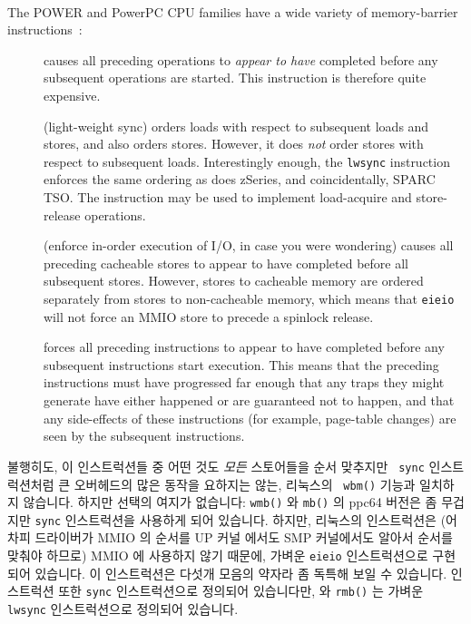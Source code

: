 The POWER and PowerPC\textsuperscript{\textregistered}
CPU families have a wide variety of memory-barrier
instructions~\cite{PowerPC94,MichaelLyons05a}:
\begin{description}
\item	[] causes all preceding operations to {\em appear to have}
	completed before any subsequent operations are started.
	This instruction is therefore quite expensive.
\item	[] (light-weight sync) orders loads with respect to
	subsequent loads and stores, and also orders stores.
	However, it does {\em not} order stores with respect to subsequent
	loads.
	Interestingly enough, the {\tt lwsync} instruction enforces
	the same ordering as does zSeries, and coincidentally,
	SPARC TSO.
	The  instruction may be used to implement
	load-acquire and store-release operations.
\item	[] (enforce in-order execution of I/O, in case you
	were wondering) causes all preceding cacheable stores to appear
	to have completed before all subsequent stores.
	However, stores to cacheable memory are ordered separately from
	stores to non-cacheable memory, which means that {\tt eieio}
	will not force an MMIO store to precede a spinlock release.
\item	[] forces all preceding instructions to appear to have
	completed before any subsequent instructions start execution.
	This means that the preceding instructions must have progressed
	far enough that any traps they might generate have either happened
	or are guaranteed not to happen, and that any side-effects of
	these instructions (for example, page-table changes) are seen by the
	subsequent instructions.
\end{description}
\fi

불행히도, 이 인스트럭션들 중 어떤 것도 {\em 모든} 스토어들을 순서 맞추지만 {\tt
sync} 인스트럭션처럼 큰 오버헤드의 많은 동작을 요하지는 않는, 리눅스의 {\tt
wbm()} 기능과 일치하지 않습니다.
하지만 선택의 여지가 없습니다: {\tt wmb()} 와 {\tt mb()} 의 ppc64 버전은 좀
무겁지만 {\tt sync} 인스트럭션을 사용하게 되어 있습니다.
하지만, 리눅스의  인스트럭션은 (어차피 드라이버가 MMIO 의
순서를 UP 커널 에서도 SMP 커널에서도 알아서 순서를 맞춰야 하므로) MMIO 에
사용하지 않기 때문에, 가벼운 {\tt eieio} 인스트럭션으로 구현되어 있습니다.
이 인스트럭션은 다섯개 모음의 약자라 좀 독특해 보일 수 있습니다.
 인스트럭션 또한 {\tt sync} 인스트럭션으로 정의되어 있습니다만,
 와 {\tt rmb()} 는 가벼운 {\tt lwsync} 인스트럭션으로 정의되어
있습니다.
\iffalse

